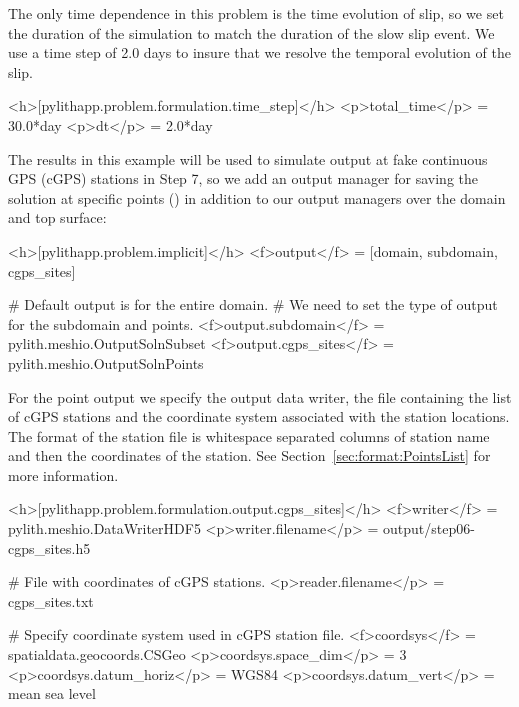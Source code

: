 The only time dependence in this problem is the time evolution of
slip, so we set the duration of the simulation to match the duration
of the slow slip event. We use a time step of 2.0 days to insure that
we resolve the temporal evolution of the slip.
\begin{cfg}
<h>[pylithapp.problem.formulation.time_step]</h>
<p>total_time</p> = 30.0*day
<p>dt</p> = 2.0*day
\end{cfg}

The results in this example will be used to simulate output at fake
continuous GPS (cGPS) stations in Step 7, so we add an output manager
for saving the solution at specific points ()
in addition to our output managers over the domain and top surface:
\begin{cfg}
<h>[pylithapp.problem.implicit]</h>
<f>output</f> = [domain, subdomain, cgps_sites]

# Default output is for the entire domain.
# We need to set the type of output for the subdomain and points.
<f>output.subdomain</f> = pylith.meshio.OutputSolnSubset
<f>output.cgps_sites</f> = pylith.meshio.OutputSolnPoints
\end{cfg}

For the point output we specify the output data writer, the file
containing the list of cGPS stations and the coordinate system
associated with the station locations. The format of the station file
is whitespace separated columns of station name and then the
coordinates of the station. See Section~\vref{sec:format:PointsList}
for more information.
\begin{cfg}
<h>[pylithapp.problem.formulation.output.cgps_sites]</h>
<f>writer</f> = pylith.meshio.DataWriterHDF5
<p>writer.filename</p> = output/step06-cgps_sites.h5

# File with coordinates of cGPS stations.
<p>reader.filename</p> = cgps_sites.txt

# Specify coordinate system used in cGPS station file.
<f>coordsys</f> = spatialdata.geocoords.CSGeo
<p>coordsys.space_dim</p> = 3
<p>coordsys.datum_horiz</p> = WGS84
<p>coordsys.datum_vert</p> = mean sea level
\end{cfg}

